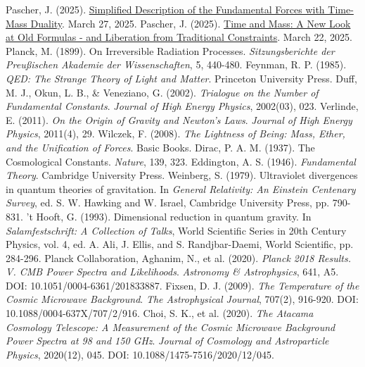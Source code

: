 \documentclass[12pt,a4paper]{article}
\begin{document}
\begin{thebibliography}{99}
		 Pascher, J. (2025). \href{https://github.com/jpascher/T0-Time-Mass-Duality/tree/main/2/pdf/English/Vereinfachte Beschreibung der vier Grundkräfte mit Zeit-Masse-Dualität_en.pdf}{Simplified Description of the Fundamental Forces with Time-Mass Duality}. March 27, 2025.
		 Pascher, J. (2025). \href{https://github.com/jpascher/T0-Time-Mass-Duality/tree/main/2/pdf/English/Zeit und Masse Ein neuer Blick auf alte Formeln – und die Befreiung von traditionellen Fesseln_en.pdf}{Time and Mass: A New Look at Old Formulas - and Liberation from Traditional Constraints}. March 22, 2025.
		 Planck, M. (1899). On Irreversible Radiation Processes. \textit{Sitzungsberichte der Preußischen Akademie der Wissenschaften}, 5, 440-480.
		 Feynman, R. P. (1985). \textit{QED: The Strange Theory of Light and Matter}. Princeton University Press.
		 Duff, M. J., Okun, L. B., \& Veneziano, G. (2002). \textit{Trialogue on the Number of Fundamental Constants}. \textit{Journal of High Energy Physics}, 2002(03), 023.
		 Verlinde, E. (2011). \textit{On the Origin of Gravity and Newton's Laws}. \textit{Journal of High Energy Physics}, 2011(4), 29.
		 Wilczek, F. (2008). \textit{The Lightness of Being: Mass, Ether, and the Unification of Forces}. Basic Books.
		 Dirac, P. A. M. (1937). The Cosmological Constants. \textit{Nature}, 139, 323.
		 Eddington, A. S. (1946). \textit{Fundamental Theory}. Cambridge University Press.
		 Weinberg, S. (1979). Ultraviolet divergences in quantum theories of gravitation. In \textit{General Relativity: An Einstein Centenary Survey}, ed. S. W. Hawking and W. Israel, Cambridge University Press, pp. 790-831.
		 't Hooft, G. (1993). Dimensional reduction in quantum gravity. In \textit{Salamfestschrift: A Collection of Talks}, World Scientific Series in 20th Century Physics, vol. 4, ed. A. Ali, J. Ellis, and S. Randjbar-Daemi, World Scientific, pp. 284-296.
		 Planck Collaboration, Aghanim, N., et al. (2020). \textit{Planck 2018 Results. V. CMB Power Spectra and Likelihoods}. \textit{Astronomy \& Astrophysics}, 641, A5. DOI: 10.1051/0004-6361/201833887.
		 Fixsen, D. J. (2009). \textit{The Temperature of the Cosmic Microwave Background}. \textit{The Astrophysical Journal}, 707(2), 916-920. DOI: 10.1088/0004-637X/707/2/916.
		 Choi, S. K., et al. (2020). \textit{The Atacama Cosmology Telescope: A Measurement of the Cosmic Microwave Background Power Spectra at 98 and 150 GHz}. \textit{Journal of Cosmology and Astroparticle Physics}, 2020(12), 045. DOI: 10.1088/1475-7516/2020/12/045.

\end{thebibliography}
\end{document}
